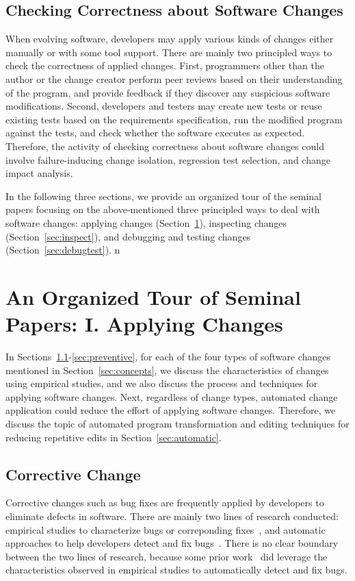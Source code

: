 \documentclass[runningheads,a4paper]{llncs}
\begin{document}
\subsection{Checking Correctness about Software Changes}

When evolving software, developers may apply various kinds of changes either manually or with some tool support. There are mainly two principled ways to check the correctness of applied changes. First, programmers other than the author or the change creator perform peer reviews based on their understanding of the program, and provide feedback if they discover any suspicious software modifications. Second, developers and testers may create new tests or reuse existing tests based on the requirements specification, run the modified program against the tests, and check whether the software executes as expected. Therefore, the activity of checking correctness about software changes could involve failure-inducing change isolation, regression test selection, and change impact analysis. 

In the following three sections, we provide an organized tour of the seminal papers focusing on the above-mentioned three principled ways to deal with software changes: applying changes (Section~\ref{sec:apply}), inspecting changes (Section~\ref{sec:inspect}), and debugging and testing changes (Section~\ref{sec:debugtest}). n 

\section{An Organized Tour of Seminal Papers: I. Applying Changes}
\label{sec:apply}
In Sections~\ref{sec:corrective}-\ref{sec:preventive}, for each of the four types of software changes mentioned in Section~\ref{sec:concepts}, we discuss the characteristics of changes using empirical studies, and we also discuss the process and techniques for applying software changes. Next, regardless of change types, automated change application could reduce the effort of applying software changes. Therefore, we discuss the topic of automated program transformation and editing techniques for reducing repetitive edits in Section~\ref{sec:automatic}.

\subsection{Corrective Change}
\label{sec:corrective}
Corrective changes such as bug fixes are frequently applied by developers to eliminate defects in software. There are mainly two lines of research conducted: empirical studies to characterize bugs or correponding fixes~\cite{Fenton2000:QAF,Li2006:TCE,Kim2006:MBF,Lu2008:LMC,Nguyen2010:RBF,Yin2011:FBB,Park2012:supplementary,Zhong2015:ESR}, and automatic approaches to help developers detect and fix bugs~\cite{Engler2000:CSR,Bush2000:SAF,Hangal2002:TDS,Hovemeyer2004:FBE,Naik2006:ESR,Weimer2009:AFP}. There is no clear boundary between the two lines of research, because some prior work~\cite{Li2006:CPMiner,Pham2010:DRS,Jin2012:UDR,Kim2013:PAR} did leverage the characteristics observed in empirical studies to automatically detect and fix bugs.
\end{document}
